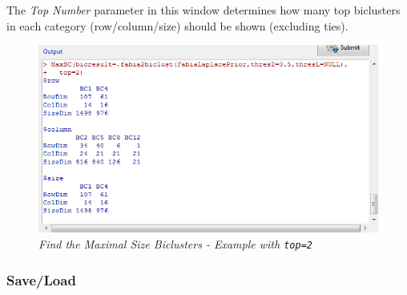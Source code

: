 \documentclass[a4paper]{article}\usepackage[]{graphicx}\usepackage[]{color}
\begin{document}
\noindent The {\it Top Number} parameter in this window determines how many top biclusters in each category (row/column/size) should be shown (excluding ties).

\begin{figure}[H]
\centering
\includegraphics[scale=0.4]{figures/MaxBC_example.png}
\caption{{\it Find the Maximal Size Biclusters - Example with \texttt{top=2}}\label{maxbc_example}}
\end{figure}

\subsubsection{Save/Load}\label{sec:SaveLoad}
\end{document}
